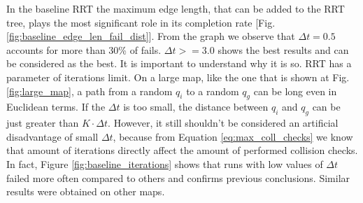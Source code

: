 \documentclass[a4paper,12pt]{article}
\DeclareRobustCommand{\[}{\begin{equation}}
\DeclareRobustCommand{\]}{\end{equation}}
\numberwithin{equation}{section}
\numberwithin{algorithm}{section}
\begin{document}
In the baseline RRT the maximum edge length, that can be added to the RRT tree, plays the most significant role in its completion rate [Fig. \ref{fig:baseline_edge_len_fail_dist}].
From the graph we observe that $\Delta{t}=0.5$ accounts for more than 30\% of fails. $\Delta{t}>=3.0$ shows the best results and can be considered as the best.
It is important to understand why it is so. RRT has a parameter of iterations limit. On a large map, like the one
that is shown at Fig. \ref{fig:large_map},
a path from a random $q_i$ to a random $q_g$ can be long even in Euclidean terms. If the $\Delta{t}$ is too small, the distance between $q_i$ and $q_g$ can be just greater than $K\cdot\Delta{t}$.
However, it still shouldn't be considered an artificial disadvantage of small $\Delta{t}$, because from Equation \ref{eq:max_coll_checks} we know that amount of iterations directly affect the amount of performed collision checks. In fact, Figure \ref{fig:baseline_iterations} shows that runs with low values of $\Delta{t}$ failed more often compared to others
and confirms previous conclusions. Similar results were obtained on other maps.
\end{document}
